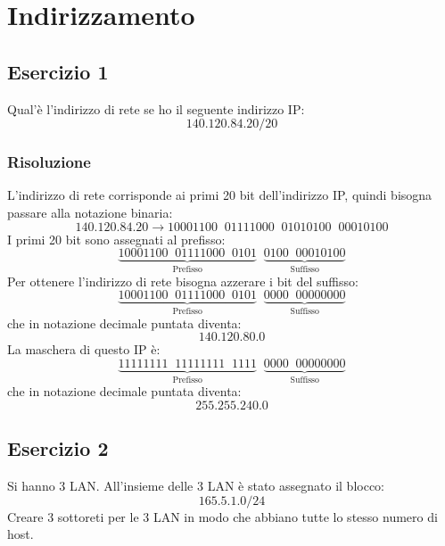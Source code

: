 \documentclass[a4paper]{article}
\begin{document}


\tableofcontents
\pagebreak

\section{Indirizzamento}
\subsection{Esercizio 1}
Qual'è l'indirizzo di rete se ho il seguente indirizzo IP:
\[
  140.120.84.20/20
\] 

\subsubsection{Risoluzione}
L'indirizzo di rete corrisponde ai primi 20 bit dell'indirizzo IP, quindi bisogna
passare alla notazione binaria:
\[
  140.120.84.20 \to 10001100 \;\; 01111000 \;\; 01010100 \;\; 00010100
\] 
I primi 20 bit sono assegnati al prefisso:
\[
  \underbrace{10001100 \;\; 01111000 \;\; 0101}_{\text{Prefisso}} \;\;
  \underbrace{0100 \;\; 00010100}_{\text{Suffisso}}
\] 
Per ottenere l'indirizzo di rete bisogna azzerare i bit del suffisso:
\[
  \underbrace{10001100 \;\; 01111000 \;\; 0101}_{\text{Prefisso}} \;\;
  \underbrace{0000 \;\; 00000000}_{\text{Suffisso}}
\] 
che in notazione decimale puntata diventa:
\[
  140.120.80.0
\] 
La maschera di questo IP è:
\[
  \underbrace{11111111 \;\; 11111111 \;\; 1111}_{\text{Prefisso}} \;\;
  \underbrace{0000 \;\; 00000000}_{\text{Suffisso}}
\] 
che in notazione decimale puntata diventa:
\[
  255.255.240.0
\] 

\subsection{Esercizio 2}
Si hanno 3 LAN. All'insieme delle 3 LAN è stato assegnato il blocco:
\[
  165.5.1.0/24
\] 
Creare 3 sottoreti per le 3 LAN in modo che abbiano tutte lo stesso numero di host.
\end{document}
